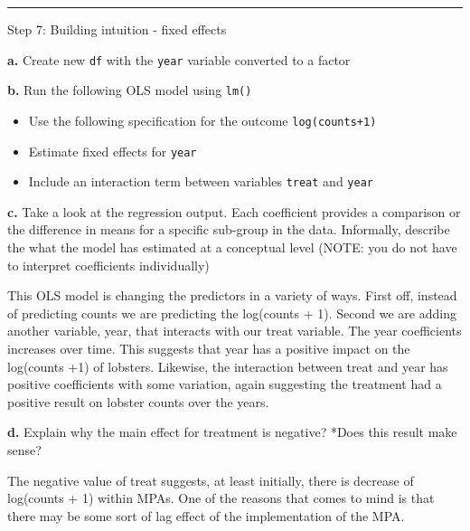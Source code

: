 \documentclass[
]{article}
\providecommand{\tightlist}{%
  \setlength{\itemsep}{0pt}\setlength{\parskip}{0pt}}
\begin{document}
\begin{center}\rule{0.5\linewidth}{0.5pt}\end{center}

Step 7: Building intuition - fixed effects

\textbf{a.} Create new \texttt{df} with the \texttt{year} variable
converted to a factor

\textbf{b.} Run the following OLS model using \texttt{lm()}

\begin{itemize}
\tightlist
\item
  Use the following specification for the outcome \texttt{log(counts+1)}
\item
  Estimate fixed effects for \texttt{year}
\item
  Include an interaction term between variables \texttt{treat} and
  \texttt{year}
\end{itemize}

\textbf{c.} Take a look at the regression output. Each coefficient
provides a comparison or the difference in means for a specific
sub-group in the data. Informally, describe the what the model has
estimated at a conceptual level (NOTE: you do not have to interpret
coefficients individually)

This OLS model is changing the predictors in a variety of ways. First
off, instead of predicting counts we are predicting the log(counts + 1).
Second we are adding another variable, year, that interacts with our
treat variable. The year coefficients increases over time. This suggests
that year has a positive impact on the log(counts +1) of lobsters.
Likewise, the interaction between treat and year has positive
coefficients with some variation, again suggesting the treatment had a
positive result on lobster counts over the years.

\textbf{d.} Explain why the main effect for treatment is negative? *Does
this result make sense?

The negative value of treat suggests, at least initially, there is
decrease of log(counts + 1) within MPAs. One of the reasons that comes
to mind is that there may be some sort of lag effect of the
implementation of the MPA.
\end{document}

